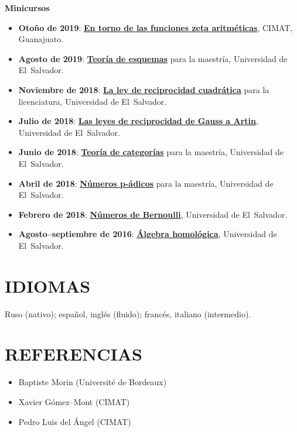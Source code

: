 \documentclass{article}
\begin{document}
\noindent\textbf{Minicursos}

\begin{itemize}
\item \textbf{Otoño de 2019}:
  \href{https://cadadr.org/cimat-zeta/}{\textbf{En torno de las funciones zeta aritméticas}},
  CIMAT, Guanajuato.

\item \textbf{Agosto de 2019}:
  \href{https://cadadr.org/san-salvador/2019-esquemas/}{\textbf{Teoría de esquemas}}
  para la maestría, Universidad de El~Salvador.

\item \textbf{Noviembre de 2018}:
  \href{https://cadadr.org/san-salvador/2018-cp-tne/reciprocidad-cuadratica.pdf}{\textbf{La ley de reciprocidad cuadrática}}
  para la licenciatura, Universidad de El~Salvador.

\item \textbf{Julio de 2018}:
  \href{https://cadadr.org/san-salvador/2018-07-reciprocidad/reciprocidad.pdf}{\textbf{Las leyes de reciprocidad de Gauss a Artin}},
  Universidad de El~Salvador.

\item \textbf{Junio de 2018}:
  \href{https://cadadr.org/san-salvador/2018-06-categorias/}{\textbf{Teoría de categorías}}
  para la maestría, Universidad de El~Salvador.

\item \textbf{Abril de 2018}:
  \href{https://cadadr.org/san-salvador/2018-04-numeros-p-adicos/}{\textbf{Números p-ádicos}}
  para la maestría, Universidad de El~Salvador.

\item \textbf{Febrero de 2018}:
  \href{https://cadadr.org/san-salvador/2017-02-bernoulli/}{\textbf{Números de Bernoulli}},
  Universidad de El~Salvador.

\item \textbf{Agosto–septiembre de 2016}:
  \href{https://cadadr.org/san-salvador/2016-08-homo/}{\textbf{Álgebra homológica}},
  Universidad de El~Salvador.
\end{itemize}

{\color{RoyalBlue}\section*{IDIOMAS}}

Ruso (nativo); español, inglés (fluido); francés, italiano (intermedio).

\vspace{1em}

{\color{RoyalBlue}\section*{REFERENCIAS}}

\begin{itemize}
\item Baptiste Morin (Université de Bordeaux)
\item Xavier Gómez--Mont (CIMAT)
\item Pedro Luis del Ángel (CIMAT)
\end{itemize}
\end{document}
